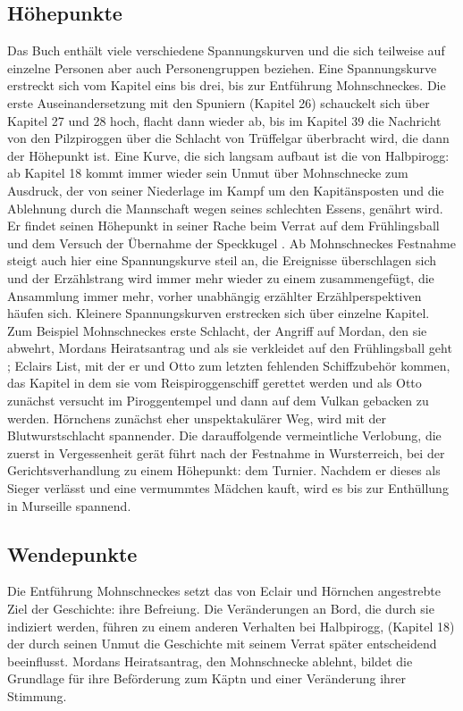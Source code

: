 \subsection{Höhepunkte}
Das Buch enthält viele verschiedene Spannungskurven und die sich teilweise auf einzelne Personen aber auch Personengruppen beziehen.  Eine Spannungskurve erstreckt sich vom Kapitel eins bis drei, bis zur Entführung Mohnschneckes. Die erste Auseinandersetzung mit den Spuniern (Kapitel 26) schauckelt sich über Kapitel 27 und 28 hoch, flacht dann wieder ab, bis im Kapitel 39 die Nachricht von den Pilzpiroggen über die Schlacht von Trüffelgar überbracht wird, die dann der Höhepunkt ist. Eine Kurve, die sich langsam aufbaut ist die von Halbpirogg: ab Kapitel 18 kommt immer wieder sein Unmut über Mohnschnecke zum Ausdruck, der von seiner Niederlage im Kampf um den Kapitänsposten und die Ablehnung durch die Mannschaft wegen seines schlechten Essens,  genährt wird. Er findet seinen Höhepunkt in seiner Rache beim Verrat auf dem Frühlingsball und dem Versuch der Übernahme der Speckkugel . Ab Mohnschneckes Festnahme steigt auch hier eine Spannungskurve steil an, die Ereignisse überschlagen sich und der Erzählstrang wird immer mehr wieder zu einem zusammengefügt, die Ansammlung immer mehr, vorher unabhängig erzählter Erzählperspektiven häufen sich. Kleinere Spannungskurven erstrecken sich über einzelne Kapitel. Zum Beispiel Mohnschneckes erste Schlacht, der Angriff auf Mordan, den sie abwehrt, Mordans Heiratsantrag und als sie verkleidet auf den Frühlingsball geht ; Eclairs List, mit der er und Otto zum letzten fehlenden Schiffzubehör kommen, das Kapitel in dem sie vom Reispiroggenschiff gerettet werden und als Otto zunächst versucht im Piroggentempel und dann auf dem Vulkan gebacken zu werden. Hörnchens zunächst eher unspektakulärer Weg, wird mit der Blutwurstschlacht spannender. Die darauffolgende vermeintliche Verlobung, die zuerst in Vergessenheit gerät führt nach der Festnahme in Wursterreich, bei der Gerichtsverhandlung zu einem Höhepunkt: dem Turnier. Nachdem er dieses als Sieger verlässt und eine vermummtes Mädchen kauft, wird es bis zur Enthüllung in Murseille spannend.

\subsection{Wendepunkte}

Die Entführung Mohnschneckes setzt das von Eclair und Hörnchen angestrebte Ziel der Geschichte: ihre Befreiung.  Die Veränderungen an Bord, die durch sie indiziert werden, führen zu einem anderen Verhalten bei Halbpirogg, (Kapitel 18) der durch seinen Unmut die Geschichte mit seinem Verrat später entscheidend beeinflusst. Mordans Heiratsantrag, den Mohnschnecke ablehnt, bildet die Grundlage für ihre Beförderung zum Käptn und einer Veränderung ihrer Stimmung. 


